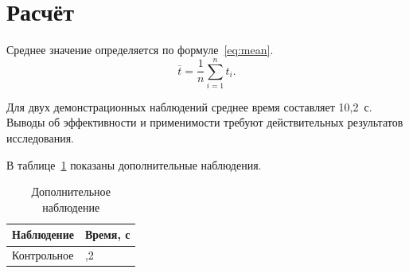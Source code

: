 \documentclass[14pt,a4paper,oneside]{extreport}
\begin{document}
\section{Расчёт}
Среднее значение определяется по формуле~\eqref{eq:mean}.
\begin{equation}\label{eq:mean}
\overline{t}=\frac{1}{n}\sum_{i=1}^{n}t_i.
\end{equation}


Для двух демонстрационных наблюдений среднее время составляет 10,2~с. Выводы об эффективности и применимости требуют действительных результатов исследования.

\begin{GostSources}
\end{GostSources}

В таблице~\ref{tab:extra} показаны дополнительные наблюдения.
\begin{table}[!htbp]
\caption{Дополнительное наблюдение}\label{tab:extra}
\centering
\begin{tabular}{|p{60mm}|>{\centering\arraybackslash}p{60mm}|}
\hline
Наблюдение & Время, с\\\hline
Контрольное & 10,2\\\hline
\end{tabular}
\end{table}
\end{document}
